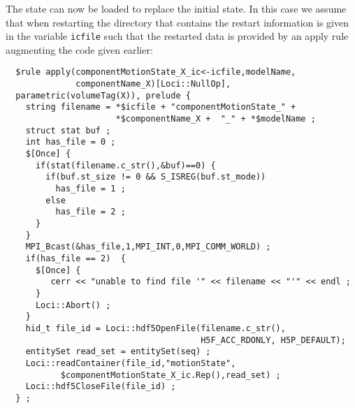 \documentclass{article}
\begin{document}
The state can now be loaded to replace the initial state.  In this
case we assume that when restarting the directory that contains the
restart information is given in the variable {\tt icfile} such that
the restarted data is provided by an apply rule augmenting the code
given earlier:
\begin{verbatim}
  $rule apply(componentMotionState_X_ic<-icfile,modelName,
              componentName_X)[Loci::NullOp],
  parametric(volumeTag(X)), prelude {
    string filename = *$icfile + "componentMotionState_" +
                      *$componentName_X +  "_" + *$modelName ;
    struct stat buf ;
    int has_file = 0 ;
    $[Once] {
      if(stat(filename.c_str(),&buf)==0) {
        if(buf.st_size != 0 && S_ISREG(buf.st_mode))
          has_file = 1 ;
        else
          has_file = 2 ;
      }
    }
    MPI_Bcast(&has_file,1,MPI_INT,0,MPI_COMM_WORLD) ;
    if(has_file == 2)  {
      $[Once] {
         cerr << "unable to find file '" << filename << "'" << endl ;
      }
      Loci::Abort() ;
    }
    hid_t file_id = Loci::hdf5OpenFile(filename.c_str(),
                                       H5F_ACC_RDONLY, H5P_DEFAULT);
    entitySet read_set = entitySet(seq) ;
    Loci::readContainer(file_id,"motionState",
           $componentMotionState_X_ic.Rep(),read_set) ;
    Loci::hdf5CloseFile(file_id) ;
  } ;
\end{verbatim}
\end{document}
